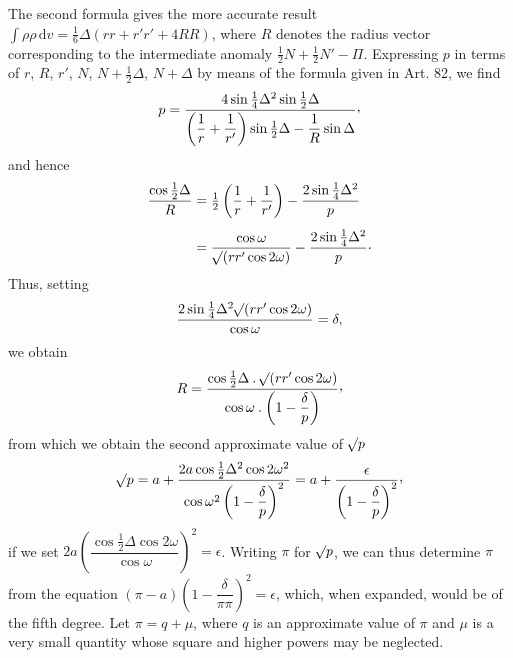 The second formula gives the more accurate result $\int\rho\rho\,\mathrm{d}v=\tfrac16\Delta(rr+r'r'+4RR)$, where $R$ denotes the radius vector corresponding to the intermediate anomaly $\tfrac12N+\tfrac12N'-\Pi$. Expressing $p$ in terms of $r$, $R$, $r'$, $N$, $N+\tfrac12\Delta$, $N+\Delta$ by means of the formula given in Art. 82, we find
\[
p=\frac{4\sin\tfrac14\Delta^2\sin\tfrac12\Delta}{\left(\dfrac1r+\dfrac1{r'}\right)\sin\tfrac12\Delta-\dfrac1R\sin\Delta}\mathpunct{\raisebox{.45ex}{,}}
\]
and hence
\[
\begin{aligned}
\frac{\cos\tfrac12\Delta}{R}&=\tfrac12\left(\frac1r+\frac1{r'}\right)-\frac{2\sin\tfrac14\Delta^2}{p}\\[4pt]
&=\frac{\cos\omega}{\mathord{{}^{}\!\surd}(rr'\cos2\omega)}-\frac{2\sin\tfrac14\Delta^2}{p}\mathpunct{\cdot}
\end{aligned}
\]
Thus, setting
\[
\frac{2\sin\tfrac14\Delta^2\mathord{{}^{}\!\surd}(rr'\cos2\omega)}{\cos\omega}=\delta,
\]
we obtain
\[
R=\frac{\cos\tfrac12\Delta\mathbin{.}\BareRoot{(rr'\cos2\omega)}}{\cos\omega\mathbin{.}\left(1-\dfrac{\delta}{p}\right)}\mathpunct{\raisebox{.45ex}{,}}
\]
from which we obtain the second approximate value of $\mathord{{}^{}\!\surd}p$
\[
\BareRoot{p}=a+\frac{2a\cos\tfrac12\Delta^2\cos2\omega^2}{\cos\omega^2\left(1-\dfrac{\delta}{p}\right)^2}=a+\frac{\epsilon}{\left(1-\dfrac{\delta}{p}\right)^2}\mathpunct{\raisebox{.45ex}{,}}
\]
if we set $2a\left(\dfrac{\cos\tfrac12\Delta\cos2\omega}{\cos\omega}\right)^2=\epsilon$. Writing $\pi$ for $\mathord{{}^{}\!\surd}p$, we can thus determine $\pi$ from the equation $(\pi-a)\left(1-\dfrac{\delta}{\pi\pi}\right)^2=\epsilon$, which, when expanded, would be of the fifth degree. Let $\pi=q+\mu$, where $q$ is an approximate value of $\pi$ and $\mu$ is a very small quantity whose square and higher powers may be neglected.

